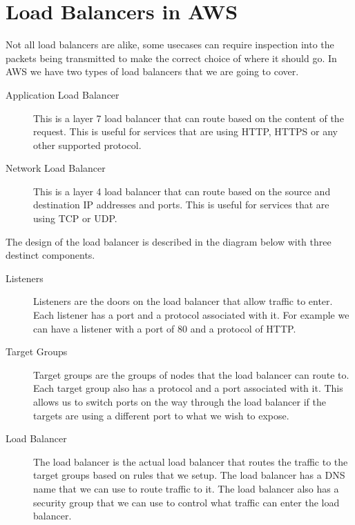 \documentclass{csse4400}
\begin{document}
\section{Load Balancers in AWS}

Not all load balancers are alike, some usecases can require inspection into the packets being transmitted to make the correct choice of where it should go. In AWS we have two types of load balancers that we are going to cover.

\begin{description}
  \item[Application Load Balancer] This is a layer 7 load balancer that can route based on the content of the request. This is useful for services that are using HTTP, HTTPS or any other supported protocol.
  \item[Network Load Balancer] This is a layer 4 load balancer that can route based on the source and destination IP addresses and ports. This is useful for services that are using TCP or UDP.
\end{description}

The design of the load balancer is described in the diagram below with three destinct components. 

\begin{description}
  \item[Listeners] Listeners are the doors on the load balancer that allow traffic to enter. Each listener has a port and a protocol associated with it. For example we can have a listener with a port of 80 and a protocol of HTTP.
  \item[Target Groups] Target groups are the groups of nodes that the load balancer can route to. Each target group also has a protocol and a port associated with it. This allows us to switch ports on the way through the load balancer if the targets are using a different port to what we wish to expose.
  \item[Load Balancer] The load balancer is the actual load balancer that routes the traffic to the target groups based on rules that we setup. The load balancer has a DNS name that we can use to route traffic to it. The load balancer also has a security group that we can use to control what traffic can enter the load balancer. 
\end{description}
\end{document}
